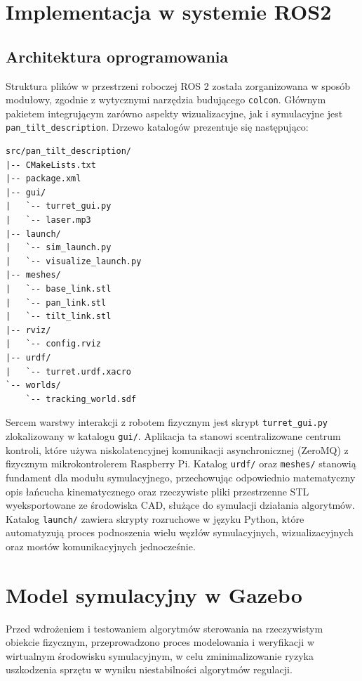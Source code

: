 \documentclass[a4paper,twoside,12pt]{book}
\begin{document}
\section{Implementacja w systemie ROS2}
\subsection{Architektura oprogramowania}
Struktura plików w przestrzeni roboczej ROS 2 została zorganizowana w sposób modułowy, zgodnie z wytycznymi narzędzia budującego \texttt{colcon}. Głównym pakietem integrującym zarówno aspekty wizualizacyjne, jak i symulacyjne jest \texttt{pan\_tilt\_description}. Drzewo katalogów prezentuje się następująco:

\begin{lstlisting}[basicstyle=\ttfamily\scriptsize, frame=single]
src/pan_tilt_description/
|-- CMakeLists.txt
|-- package.xml
|-- gui/
|   `-- turret_gui.py
|   `-- laser.mp3
|-- launch/
|   `-- sim_launch.py
|   `-- visualize_launch.py
|-- meshes/
|   `-- base_link.stl
|   `-- pan_link.stl
|   `-- tilt_link.stl
|-- rviz/
|   `-- config.rviz
|-- urdf/
|   `-- turret.urdf.xacro
`-- worlds/
    `-- tracking_world.sdf
\end{lstlisting}

Sercem warstwy interakcji z robotem fizycznym jest skrypt \texttt{turret\_gui.py} zlokalizowany w katalogu \texttt{gui/}. Aplikacja ta stanowi scentralizowane centrum kontroli, które używa niskolatencyjnej komunikacji asynchronicznej (ZeroMQ) z fizycznym mikrokontrolerem Raspberry Pi. Katalog \texttt{urdf/} oraz \texttt{meshes/} stanowią fundament dla modułu symulacyjnego, przechowując odpowiednio matematyczny opis łańcucha kinematycznego oraz rzeczywiste pliki przestrzenne STL wyeksportowane ze środowiska CAD, służące do symulacji działania algorytmów. Katalog \texttt{launch/} zawiera skrypty rozruchowe w języku Python, które automatyzują proces podnoszenia wielu węzłów symulacyjnych, wizualizacyjnych oraz mostów komunikacyjnych jednocześnie.

\section{Model symulacyjny w Gazebo}
Przed wdrożeniem i testowaniem algorytmów sterowania na rzeczywistym obiekcie fizycznym, przeprowadzono proces modelowania i weryfikacji w wirtualnym środowisku symulacyjnym, w celu zminimalizowanie ryzyka uszkodzenia sprzętu w wyniku niestabilności algorytmów regulacji.
\end{document}

